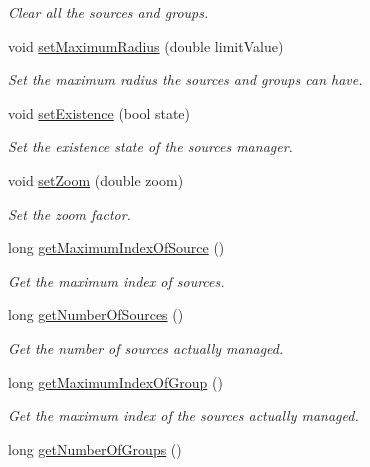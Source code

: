 \begin{DoxyCompactItemize}
\begin{DoxyCompactList}\small\item\em Clear all the sources and groups. \end{DoxyCompactList}\item 
void \hyperlink{class_hoa2_d_1_1_sources_manager_a895accfeaeafc6d4b9962ac855c12be1}{set\-Maximum\-Radius} (double limit\-Value)
\begin{DoxyCompactList}\small\item\em Set the maximum radius the sources and groups can have. \end{DoxyCompactList}\item 
void \hyperlink{class_hoa2_d_1_1_sources_manager_a9ff8a4e59d4e5737f75b06e5fe79d026}{set\-Existence} (bool state)
\begin{DoxyCompactList}\small\item\em Set the existence state of the sources manager. \end{DoxyCompactList}\item 
void \hyperlink{class_hoa2_d_1_1_sources_manager_a00813645113d4b88e13dd075ddb8c16a}{set\-Zoom} (double zoom)
\begin{DoxyCompactList}\small\item\em Set the zoom factor. \end{DoxyCompactList}\item 
long \hyperlink{class_hoa2_d_1_1_sources_manager_a2af98a54db303dd442c9fa35a7e130a6}{get\-Maximum\-Index\-Of\-Source} ()
\begin{DoxyCompactList}\small\item\em Get the maximum index of sources. \end{DoxyCompactList}\item 
long \hyperlink{class_hoa2_d_1_1_sources_manager_a8883e30416f13af4997675bde227a746}{get\-Number\-Of\-Sources} ()
\begin{DoxyCompactList}\small\item\em Get the number of sources actually managed. \end{DoxyCompactList}\item 
long \hyperlink{class_hoa2_d_1_1_sources_manager_aa0c0e51a5073370f6755670d054046f0}{get\-Maximum\-Index\-Of\-Group} ()
\begin{DoxyCompactList}\small\item\em Get the maximum index of the sources actually managed. \end{DoxyCompactList}\item 
long \hyperlink{class_hoa2_d_1_1_sources_manager_a9319e8f5a729492770f5bfec9b0c1496}{get\-Number\-Of\-Groups} ()

\end{DoxyCompactItemize}
